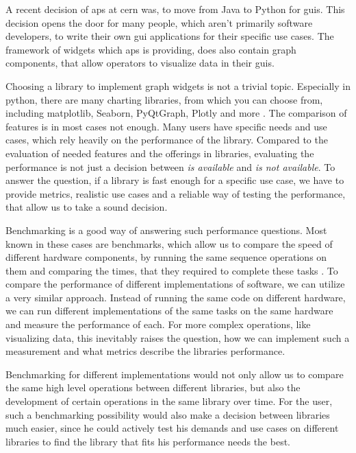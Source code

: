 A recent decision of \gls{aps} at \gls{cern} was, to move from Java to Python
for \glspl{gui}. This decision opens the door for many people, which aren't
primarily software developers, to write their own \gls{gui} applications for
their specific use cases. The framework of widgets which \gls{aps} is providing,
does also contain graph components, that allow operators to visualize data in
their \glspl{gui}.

Choosing a library to implement graph widgets is not a trivial topic. Especially
in python, there are many charting libraries, from which you can choose from,
including matplotlib, Seaborn, PyQtGraph, Plotly and more \cite{PyDataVisLibs}.
The comparison of features is in most cases not enough. Many users have
specific needs and use cases, which rely heavily on the performance of the
library. Compared to the evaluation of needed features and the offerings in
libraries, evaluating the performance is not just a decision between \emph{is
available} and \emph{is not available}. To answer the question, if a library is
fast enough for a specific use case, we have to provide metrics, realistic use
cases and a reliable way of testing the performance, that allow us to take a
sound decision.

Benchmarking is a good way of answering such performance questions. Most known
in these cases are benchmarks, which allow us to compare the speed of different
hardware components, by running the same sequence operations on them and
comparing the times, that they required to complete these tasks
\cite{OverviewBenchmarks}. To compare the performance of different
implementations of software, we can utilize a very similar approach. Instead of
running the same code on different hardware, we can run different
implementations of the same tasks on the same hardware and measure the
performance of each. For more complex operations, like visualizing data, this inevitably
raises the question, how we can implement such a measurement and what metrics
describe the libraries performance.

Benchmarking for different implementations would not only allow us to compare
the same high level operations between different libraries, but also the
development of certain operations in the same library over time. For the user,
such a benchmarking possibility would also make a decision between libraries
much easier, since he could actively test his demands and use cases on different
libraries to find the library that fits his performance needs the best.




